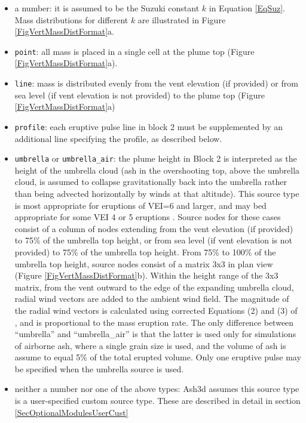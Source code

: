 \begin{itemize}
\item a number: it is assumed to be the Suzuki constant $k$ in Equation \ref{EqSuz}.  Mass distributions for different $k$ are illustrated in Figure \ref{FigVertMassDistFormat}a.
\item \texttt{point}: all mass is placed in a single cell at the plume top (Figure \ref{FigVertMassDistFormat}a).
\item \texttt{line}:  mass is distributed evenly from the vent elevation (if provided) or from sea level (if vent elevation is not provided) to the plume top (Figure \ref{FigVertMassDistFormat}a)
\item \texttt{profile}: each eruptive pulse line in block 2 must be supplemented by an additional line specifying the profile, as described below.
\item \texttt{umbrella} or \texttt{umbrella\_air}: the plume height in Block 2 is interpreted as the height of the umbrella cloud (ash in the overshooting top, above the umbrella cloud, is assumed to collapse gravitationally back into the umbrella rather than being advected horizontally by winds at that altitude).  This source type is most appropriate for eruptions of VEI=6 and larger, and may bed appropriate for some VEI 4 or 5 eruptions \cite{Mastin20}.  Source nodes for these cases consist of a column of nodes extending from the vent elevation (if provided) to 75\% of the umbrella top height, or from sea level (if vent elevation is not provided) to 75\% of the umbrella top height. From 75\% to 100\% of the umbrella top height, source nodes consist of a matrix 3x3 in plan view (Figure \ref{FigVertMassDistFormat}b).  Within the height range of the 3x3 matrix, from the vent outward to the edge of the expanding umbrella cloud, radial wind vectors are added to the ambient wind field.  The magnitude of the radial wind vectors is calculated using corrected Equations (2) and (3) of \cite{Costa13}, and is proportional to the mass eruption rate.
The only difference between ``umbrella'' and ``umbrella\_air'' is that the latter is used only for simulations of airborne ash, where a single grain size is used, and the volume of ash is assume to equal  5\% of the total erupted volume.  Only one eruptive pulse may be specified when the umbrella source is used.
\item neither a number nor one of the above types: Ash3d assumes this source type is a user-specified custom source type.  These are described in detail in section \ref{SecOptionalModulesUserCust}
\end{itemize}

